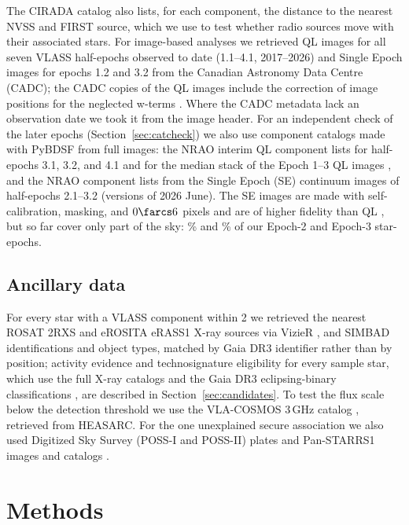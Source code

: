 \documentclass[linenumbers]{aastex702}
\begin{document}
The CIRADA catalog also lists, for each component, the distance to the nearest NVSS \citep{Condon1998} and FIRST \citep{Becker1995,Helfand2015} source, which we use to test whether radio sources move with their associated stars. For image-based analyses we retrieved QL images for all seven VLASS half-epochs observed to date (1.1--4.1, 2017--2026) and Single Epoch images for epochs 1.2 and 3.2 from the Canadian Astronomy Data Centre (CADC); the CADC copies of the QL images include the correction of image positions for the neglected w-terms \citep{Kimball2026}. Where the CADC metadata lack an observation date we took it from the image header. For an independent check of the later epochs (Section~\ref{sec:catcheck}) we also use component catalogs made with PyBDSF from full images: the NRAO interim QL component lists for half-epochs 3.1, 3.2, and 4.1 and for the median stack of the Epoch 1--3 QL images \citep{Lacy2025}, and the NRAO component lists from the Single Epoch (SE) continuum images of half-epochs 2.1--3.2 (versions of 2026 June). The SE images are made with self-calibration, masking, and $0\farcs6$ pixels and are of higher fidelity than QL \citep{Kimball2026}, but so far cover only part of the sky: \XcSEcovTwo\% and \XcSEcovThree\% of our Epoch-2 and Epoch-3 star-epochs.

\subsection{Ancillary data} \label{sec:ancillary}

For every star with a VLASS component within 2 we retrieved the nearest ROSAT 2RXS \citep[within 40\arcsec;][]{Boller2016} and eROSITA eRASS1 \citep[within 20\arcsec;][]{Merloni2024} X-ray sources via VizieR \citep{Ochsenbein2000}, and SIMBAD \citep{Wenger2000} identifications and object types, matched by Gaia DR3 identifier rather than by position; activity evidence and technosignature eligibility for every sample star, which use the full X-ray catalogs and the Gaia DR3 eclipsing-binary classifications \citep{Mowlavi2023}, are described in Section~\ref{sec:candidates}. To test the flux scale below the detection threshold we use the VLA-COSMOS 3\,GHz catalog \citep{Smolcic2017}, retrieved from HEASARC. For the one unexplained secure association we also used Digitized Sky Survey (POSS-I and POSS-II) plates and Pan-STARRS1 images and catalogs \citep{Chambers2016,Flewelling2020}.

\section{Methods} \label{sec:methods}
\end{document}
